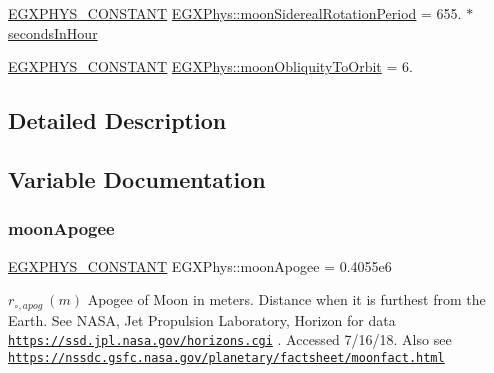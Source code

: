 \begin{DoxyCompactItemize}
\item 
\mbox{\hyperlink{group___e_g_x_phys-_constants-_macros_ga76980d288494ce1714c9ac68a95ba702}{E\+G\+X\+P\+H\+Y\+S\+\_\+\+C\+O\+N\+S\+T\+A\+NT}} \mbox{\hyperlink{group___e_g_x_phys-_constants-_astrophysics-_solar_system-_moon-_orbit_ga321f508eb0704d929b090dac0a892682}{E\+G\+X\+Phys\+::moon\+Sidereal\+Rotation\+Period}} = 655. $\ast$ \mbox{\hyperlink{namespace_e_g_x_phys_a7c3165cd93e36f1fb8e9fef80f117bef}{seconds\+In\+Hour}}
\item 
\mbox{\hyperlink{group___e_g_x_phys-_constants-_macros_ga76980d288494ce1714c9ac68a95ba702}{E\+G\+X\+P\+H\+Y\+S\+\_\+\+C\+O\+N\+S\+T\+A\+NT}} \mbox{\hyperlink{group___e_g_x_phys-_constants-_astrophysics-_solar_system-_moon-_orbit_ga6ef508b358a853d8882dbf6570ed053c}{E\+G\+X\+Phys\+::moon\+Obliquity\+To\+Orbit}} = 6.
\end{DoxyCompactItemize}


\subsection{Detailed Description}


\subsection{Variable Documentation}
\mbox{\label{group___e_g_x_phys-_constants-_astrophysics-_solar_system-_moon-_orbit_ga5d0c2e897e5b6b30409b046e37dd275e}} 
\subsubsection{\texorpdfstring{moon\+Apogee}{moonApogee}}
{\footnotesize\ttfamily \mbox{\hyperlink{group___e_g_x_phys-_constants-_macros_ga76980d288494ce1714c9ac68a95ba702}{E\+G\+X\+P\+H\+Y\+S\+\_\+\+C\+O\+N\+S\+T\+A\+NT}} E\+G\+X\+Phys\+::moon\+Apogee = 0.\+4055e6}

$ r_{\circ,apog} \ (m)$ Apogee of Moon in meters. Distance when it is furthest from the Earth. See N\+A\+SA, Jet Propulsion Laboratory, Horizon for data \href{https://ssd.jpl.nasa.gov/horizons.cgi}{\tt https\+://ssd.\+jpl.\+nasa.\+gov/horizons.\+cgi} . Accessed 7/16/18. Also see \href{https://nssdc.gsfc.nasa.gov/planetary/factsheet/moonfact.html}{\tt https\+://nssdc.\+gsfc.\+nasa.\+gov/planetary/factsheet/moonfact.\+html} \mbox{\label{group___e_g_x_phys-_constants-_astrophysics-_solar_system-_moon-_orbit_ga6ef508b358a853d8882dbf6570ed053c}} 
